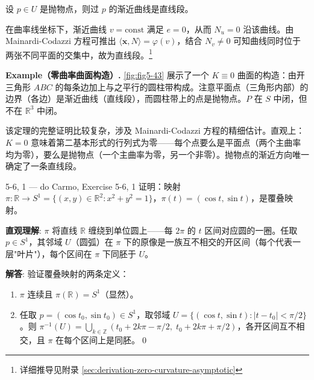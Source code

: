 \begin{Lemma}\label{zero-curvature-asymptotic}
设 $p \in U$ 是抛物点，则过 $p$ 的渐近曲线是直线段。
\end{Lemma}

\begin{Proof}[证明概要]
在曲率线坐标下，渐近曲线 $v=\mathrm{const}$ 满足 $e=0$，从而 $N_u=0$ 沿该曲线。由 Mainardi-Codazzi 方程可推出 $\langle \mathbf{x}, N\rangle = \varphi(v)$，结合 $N_v \neq 0$ 可知曲线同时位于两张不同平面的交集中，故为直线段。\footnote{详细推导见附录 \cref{sec:derivation-zero-curvature-asymptotic}}
\end{Proof}

\textbf{Example（零曲率曲面构造）.} \cref{fig:fig5-43} 展示了一个 $K \equiv 0$ 曲面的构造：由开三角形 $ABC$ 的每条边加上与之平行的圆柱带构成。注意平面点（三角形内部）的边界（各边）是渐近曲线（直线段），而圆柱带上的点是抛物点。$P$ 在 $S$ 中闭，但不在 $\mathbb{R}^3$ 中闭。

\begin{Remark}
该定理的完整证明比较复杂，涉及 Mainardi-Codazzi 方程的精细估计。直观上：$K=0$ 意味着第二基本形式的行列式为零——每个点要么是平面点（两个主曲率均为零），要么是抛物点（一个主曲率为零，另一个非零）。抛物点的渐近方向唯一确定了一条直线段。
\end{Remark}

\begin{exercise}{5-6, 1 — do Carmo, Exercise 5-6, 1}
证明：映射 $\pi: \mathbb{R} \to S^1 = \{(x,y)\in\mathbb{R}^2: x^2+y^2=1\}$，$\pi(t) = (\cos t, \sin t)$，是覆叠映射。
\end{exercise}
\begin{solution}
\textbf{直观理解}: $\pi$ 将直线 $\mathbb{R}$ 缠绕到单位圆上——每 $2\pi$ 的 $t$ 区间对应圆的一圈。任取 $p\in S^1$，其邻域 $U$（圆弧）在 $\pi$ 下的原像是一族互不相交的开区间（每个代表一层"叶片"），每个区间在 $\pi$ 下同胚于 $U$。

\textbf{解答}: 验证覆叠映射的两条定义：
\begin{enumerate}
  \item $\pi$ 连续且 $\pi(\mathbb{R})=S^1$（显然）。
  \item 任取 $p=(\cos t_0,\sin t_0)\in S^1$，取邻域 $U=\{(\cos t,\sin t):|t-t_0|<\pi/2\}$。则 $\pi^{-1}(U)=\bigcup_{k\in\mathbb{Z}}(t_0+2k\pi-\pi/2,\;t_0+2k\pi+\pi/2)$，各开区间互不相交，且 $\pi$ 在每个区间上是同胚。\qed
\end{enumerate}
\end{solution}

